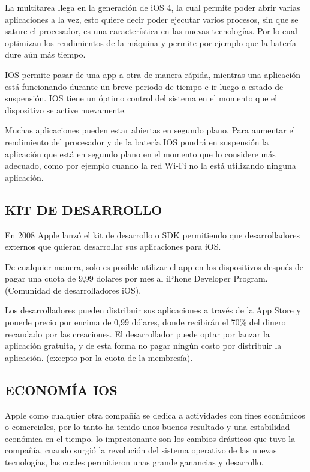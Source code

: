 La multitarea llega en la generación de iOS 4, la cual permite
poder abrir varias aplicaciones a la vez, esto quiere decir poder
ejecutar varios procesos, sin que se sature el procesador, es una
característica en las nuevas tecnologías. Por lo cual optimizan
los rendimientos de la máquina y permite por ejemplo que la
batería dure aún más tiempo.

IOS permite pasar de una app a otra de manera rápida,
mientras una aplicación está funcionando durante un breve
periodo de tiempo e ir luego a estado de suspensión. IOS
tiene un óptimo control del sistema en el momento que el
dispositivo se active nuevamente.

Muchas aplicaciones pueden estar abiertas en segundo
plano. Para aumentar el rendimiento del procesador y de la
batería IOS pondrá en suspensión la aplicación que está en
segundo plano en el momento que lo considere más
adecuado, como por ejemplo cuando la red Wi-Fi no la está
utilizando ninguna aplicación.

\subsection*{KIT DE DESARROLLO}

En 2008 Apple lanzó el kit de desarrollo o SDK permitiendo que
desarrolladores externos que quieran desarrollar sus
aplicaciones para iOS.

De cualquier manera, solo es posible utilizar el app en los
dispositivos después de pagar una cuota de 9,99 dolares por mes
al iPhone Developer Program. (Comunidad de desarrolladores
iOS).

Los desarrolladores pueden distribuir sus aplicaciones a través
de la App Store y ponerle precio por encima de 0,99 dólares,
donde recibirán el 70\% del dinero recaudado por las creaciones.
El desarrollador puede optar por lanzar la aplicación gratuita, y
de esta forma no pagar ningún costo por distribuir la aplicación.
(excepto por la cuota de la membresía).

\subsection*{ECONOMÍA IOS}

Apple como cualquier otra compañía se dedica a actividades
con fines económicos o comerciales, por lo tanto ha tenido unos
buenos resultado y una estabilidad económica en el tiempo. lo
impresionante son los cambios drásticos que tuvo la compañía,
cuando surgió la revolución del sistema operativo de las nuevas
tecnologías, las cuales permitieron unas grande ganancias y
desarrollo.

